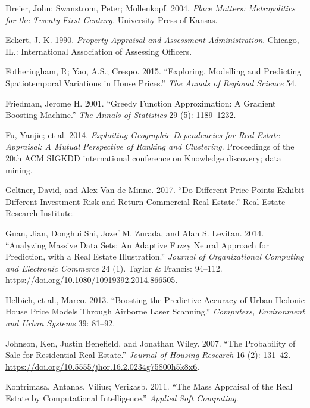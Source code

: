\documentclass[12pt,]{article}
\begin{document}
\leavevmode\hypertarget{ref-Dreier2004}{}%
Dreier, John; Swanstrom, Peter; Mollenkopf. 2004. \emph{Place Matters:
Metropolitics for the Twenty-First Century.} University Press of Kansas.

\leavevmode\hypertarget{ref-Eckert1990}{}%
Eckert, J. K. 1990. \emph{Property Appraisal and Assessment
Administration}. Chicago, IL.: International Association of Assessing
Officers.

\leavevmode\hypertarget{ref-Fotheringham2015}{}%
Fotheringham, R; Yao, A.S.; Crespo. 2015. ``Exploring, Modelling and
Predicting Spatiotemporal Variations in House Prices.'' \emph{The Annals
of Regional Science} 54.

\leavevmode\hypertarget{ref-Friedman2001}{}%
Friedman, Jerome H. 2001. ``Greedy Function Approximation: A Gradient
Boosting Machine.'' \emph{The Annals of Statistics} 29 (5): 1189--1232.

\leavevmode\hypertarget{ref-Fu2014}{}%
Fu, Yanjie; et al. 2014. \emph{Exploiting Geographic Dependencies for
Real Estate Appraisal: A Mutual Perspective of Ranking and Clustering}.
Proceedings of the 20th ACM SIGKDD international conference on Knowledge
discovery; data mining.

\leavevmode\hypertarget{ref-Geltner2017}{}%
Geltner, David, and Alex Van de Minne. 2017. ``Do Different Price Points
Exhibit Different Investment Risk and Return Commercial Real Estate.''
Real Estate Research Institute.

\leavevmode\hypertarget{ref-Guan2014}{}%
Guan, Jian, Donghui Shi, Jozef M. Zurada, and Alan S. Levitan. 2014.
``Analyzing Massive Data Sets: An Adaptive Fuzzy Neural Approach for
Prediction, with a Real Estate Illustration.'' \emph{Journal of
Organizational Computing and Electronic Commerce} 24 (1). Taylor \&
Francis: 94--112. \url{https://doi.org/10.1080/10919392.2014.866505}.

\leavevmode\hypertarget{ref-Helbich2013}{}%
Helbich, et al., Marco. 2013. ``Boosting the Predictive Accuracy of
Urban Hedonic House Price Models Through Airborne Laser Scanning.''
\emph{Computers, Environment and Urban Systems} 39: 81--92.

\leavevmode\hypertarget{ref-Johnson2007}{}%
Johnson, Ken, Justin Benefield, and Jonathan Wiley. 2007. ``The
Probability of Sale for Residential Real Estate.'' \emph{Journal of
Housing Research} 16 (2): 131--42.
\url{https://doi.org/10.5555/jhor.16.2.0234g75800h5k8x6}.

\leavevmode\hypertarget{ref-Kontrimasa2011}{}%
Kontrimasa, Antanas, Vilius; Verikasb. 2011. ``The Mass Appraisal of the
Real Estate by Computational Intelligence.'' \emph{Applied Soft
Computing}.
\end{document}
